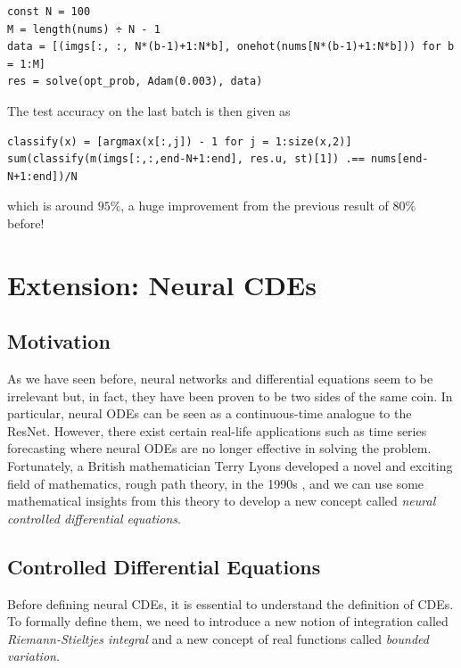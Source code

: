 \documentclass[a4paper,11pt,titlepage]{article}
\theoremstyle{definition}
\theoremstyle{plain}
\theoremstyle{remark}
\begin{document}
\begin{verbatim}
const N = 100
M = length(nums) ÷ N - 1
data = [(imgs[:, :, N*(b-1)+1:N*b], onehot(nums[N*(b-1)+1:N*b])) for b = 1:M]
res = solve(opt_prob, Adam(0.003), data)
\end{verbatim}

The test accuracy on the last batch is then given as

\begin{verbatim}
classify(x) = [argmax(x[:,j]) - 1 for j = 1:size(x,2)]
sum(classify(m(imgs[:,:,end-N+1:end], res.u, st)[1]) .== nums[end-N+1:end])/N
\end{verbatim}

which is around $95\%$, a huge improvement from the previous result of $80\%$ before!

\pagebreak
\section{Extension: Neural CDEs}
\label{sec:extension}

\subsection{Motivation}

As we have seen before, neural networks and differential equations seem to be irrelevant but, in fact, they have been proven to be two sides of the same coin. In particular, neural ODEs can be seen as a continuous-time analogue to the ResNet. However, there exist certain real-life applications such as time series forecasting where neural ODEs are no longer effective in solving the problem. Fortunately, a British mathematician Terry Lyons developed a novel and exciting field of mathematics, rough path theory, in the 1990s \cite{kidger2022neural}, and we can use some mathematical insights from this theory to develop a new concept called \textit{neural controlled differential equations}.

\subsection{Controlled Differential Equations}

Before defining neural CDEs, it is essential to understand the definition of CDEs. To formally define them, we need to introduce a new notion of integration called \textit{Riemann-Stieltjes integral} and a new concept of real functions called \textit{bounded variation}.
\end{document}
